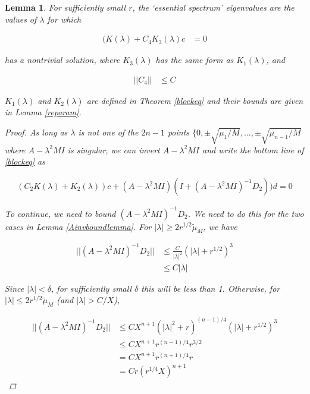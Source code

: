 \documentclass[12pt]{article}
\newtheorem{lemma}{Lemma}
\begin{document}
\begin{lemma}\label{ceqlemma}
For sufficiently small $r$, the `essential spectrum' eigenvalues are the values of $\lambda$ for which 

\begin{align}\label{eqforc}
(K(\lambda) + C_4 K_3(\lambda)c &= 0
\end{align}

has a nontrivial solution, where $K_3(\lambda)$ has the same form as $K_1(\lambda)$, and

\begin{align*}
||C_4|| &\leq C
\end{align*}

$K_1(\lambda)$ and $K_2(\lambda)$ are defined in Theorem \ref{blockeq} and their bounds are given in Lemma \ref{reparam}.

\begin{proof}
As long as $\lambda$ is not one of the $2n - 1$ points $\{0, \pm \sqrt{\mu_1/M}, \dots, \pm \sqrt{\mu_{n-1}/M}$ where $A - \lambda^2 MI$ is singular, we can invert $A - \lambda^2 MI$ and write the bottom line of \eqref{blockeq} as 

\begin{align}\label{blockeqbottom}
(C_2 K(\lambda) + K_2(\lambda))c 
+ (A - \lambda^2 MI)(I + (A - \lambda^2 MI)^{-1} D_2))d = 0
\end{align}

To continue, we need to bound $(A - \lambda^2 MI)^{-1} D_2$. We need to do this for the two cases in Lemma \ref{Ainvboundlemma}. For $|\lambda| \geq 2 r^{1/2} \tilde{\mu}_M$, we have

\begin{align*}
|| (A - \lambda^2 MI)^{-1} D_2 || &\leq \frac{C}{|\lambda|^2} (|\lambda| + r^{1/2})^3 \\ 
&\leq C |\lambda|
\end{align*}

Since $|\lambda| < \delta$, for sufficiently small $\delta$ this will be less than 1. Otherwise, for $|\lambda| \leq 2 r^{1/2} \tilde{\mu}_M$ (and $|\lambda| > C/X$),

\begin{align*}
|| (A - \lambda^2 MI)^{-1} D_2 || &\leq C X^{n+1}\left( |\lambda|^2 + r \right)^{(n-1)/4} (|\lambda| + r^{1/2})^3 \\
&\leq C X^{n+1} r^{(n-1)/4} r^{3/2} \\ 
&= C X^{n+1} r^{(n+1)/4} r \\
&= C r (r^{1/4} X)^{n+1}
\end{align*}


\end{proof}
\end{lemma}
\end{document}

